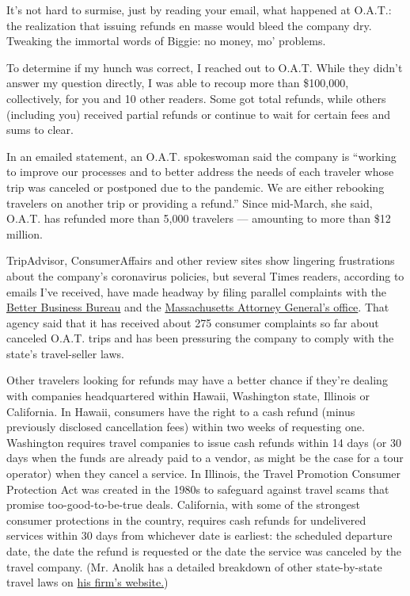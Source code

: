 It's not hard to surmise, just by reading your email, what happened at
O.A.T.: the realization that issuing refunds en masse would bleed the
company dry. Tweaking the immortal words of Biggie: no money, mo'
problems.

To determine if my hunch was correct, I reached out to O.A.T. While they
didn't answer my question directly, I was able to recoup more than
\$100,000, collectively, for you and 10 other readers. Some got total
refunds, while others (including you) received partial refunds or
continue to wait for certain fees and sums to clear.

In an emailed statement, an O.A.T. spokeswoman said the company is
``working to improve our processes and to better address the needs of
each traveler whose trip was canceled or postponed due to the pandemic.
We are either rebooking travelers on another trip or providing a
refund.'' Since mid-March, she said, O.A.T. has refunded more than 5,000
travelers --- amounting to more than \$12 million.

TripAdvisor, ConsumerAffairs and other review sites show lingering
frustrations about the company's coronavirus policies, but several Times
readers, according to emails I've received, have made headway by filing
parallel complaints with the \href{https://www.bbb.org/}{Better Business
Bureau} and the
\href{https://www.mass.gov/how-to/file-a-consumer-complaint}{Massachusetts
Attorney General's office}. That agency said that it has received about
275 consumer complaints so far about canceled O.A.T. trips and has been
pressuring the company to comply with the state's travel-seller laws.

Other travelers looking for refunds may have a better chance if they're
dealing with companies headquartered within Hawaii, Washington state,
Illinois or California. In Hawaii, consumers have the right to a cash
refund (minus previously disclosed cancellation fees) within two weeks
of requesting one. Washington requires travel companies to issue cash
refunds within 14 days (or 30 days when the funds are already paid to a
vendor, as might be the case for a tour operator) when they cancel a
service. In Illinois, the Travel Promotion Consumer Protection Act was
created in the 1980s to safeguard against travel scams that promise
too-good-to-be-true deals. California, with some of the strongest
consumer protections in the country, requires cash refunds for
undelivered services within 30 days from whichever date is earliest: the
scheduled departure date, the date the refund is requested or the date
the service was canceled by the travel company. (Mr. Anolik has a
detailed breakdown of other state-by-state travel laws on
\href{https://www.travellaw.com/page/travel-law-faq}{his firm's
website.})

